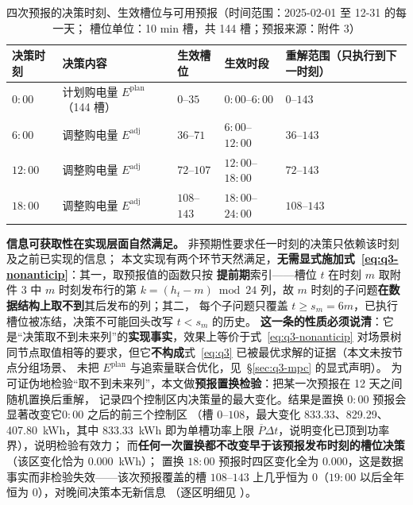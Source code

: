 \begin{table}[htbp]
  \centering
  \caption{四次预报的决策时刻、生效槽位与可用预报（时间范围：2025-02-01 至 12-31 的每一天；
            槽位单位：10 min 槽，共 144 槽；预报来源：附件 3）}
  \label{tab:q3-epochs}
  \footnotesize
  \setlength{\tabcolsep}{4pt}
  \begin{tabularx}{\linewidth}{C{1.6cm} L{3.0cm} C{2.5cm} C{2.4cm} Y}
    \toprule
    决策时刻 & 决策内容 & 生效槽位 & 生效时段 & 重解范围（只执行到下一时刻） \\
    \midrule
    \(0{:}00\) & 计划购电量 \(E^{\text{plan}}\)（144 槽） & \(0\)--\(35\) & \(0{:}00\)--\(6{:}00\) & \(0\)--\(143\) \\
    \(6{:}00\)  & 调整购电量 \(E^{\text{adj}}\) & \(36\)--\(71\) & \(6{:}00\)--\(12{:}00\) & \(36\)--\(143\) \\
    \(12{:}00\) & 调整购电量 \(E^{\text{adj}}\) & \(72\)--\(107\) & \(12{:}00\)--\(18{:}00\) & \(72\)--\(143\) \\
    \(18{:}00\) & 调整购电量 \(E^{\text{adj}}\) & \(108\)--\(143\) & \(18{:}00\)--\(24{:}00\) & \(108\)--\(143\) \\
    \bottomrule
  \end{tabularx}
\end{table}

\textbf{信息可获取性在实现层面自然满足。} 非预期性要求任一时刻的决策只依赖该时刻及之前已实现的信息；
本文实现有两个环节天然满足，\textbf{无需显式施加式~\eqref{eq:q3-nonanticip}}：其一，取预报值的函数只按
\textbf{提前期}索引——槽位 \(t\) 在时刻 \(m\) 取附件 3 中 \(m\) 时刻发布行的第
\(k=(h_t-m)\bmod24\) 列，故 \(m\) 时刻的子问题\textbf{在数据结构上取不到}其后发布的列；其二，
每个子问题只覆盖 \(t\ge s_m=6m\)，已执行槽位被冻结，决策不可能回头改写 \(t<s_m\) 的历史。
\textbf{这一条的性质必须说清}：它是“决策取不到未来列”的\textbf{实现事实}，效果上等价于式~\eqref{eq:q3-nonanticip}
对场景树同节点取值相等的要求，但它\textbf{不构成}式~\eqref{eq:q3} 已被最优求解的证据（本文未按节点分组场景、
未把 \(E^{\text{plan}}\) 与追索量联合优化，见~\S\ref{sec:q3-mpc} 的显式声明）。
为可证伪地检验“取不到未来列”，本文做\textbf{预报置换检验}：把某一次预报在 12 天之间随机置换后重解，
记录四个控制区内决策量的最大变化。结果是置换 \(0{:}00\) 预报会显著改变它\(0{:}00\) 之后的前三个控制区
（槽 \(0\)--\(108\)，最大变化 833.33、829.29、407.80~kWh，其中 833.33~kWh 即为单槽功率上限
\(\overline P\Delta t\)，说明变化已顶到功率界），说明检验有效力；
而\textbf{任何一次置换都不改变早于该预报发布时刻的槽位决策}（该区变化恰为 \(0.000\)~kWh）；
置换 \(18{:}00\) 预报时四区变化全为 \(0.000\)，这是数据事实而非检验失效——该次预报覆盖的槽
\(108\)--\(143\) 上几乎恒为 0（\(19{:}00\) 以后全年恒为 0），对晚间决策本无新信息
（逐区明细见 ）。

